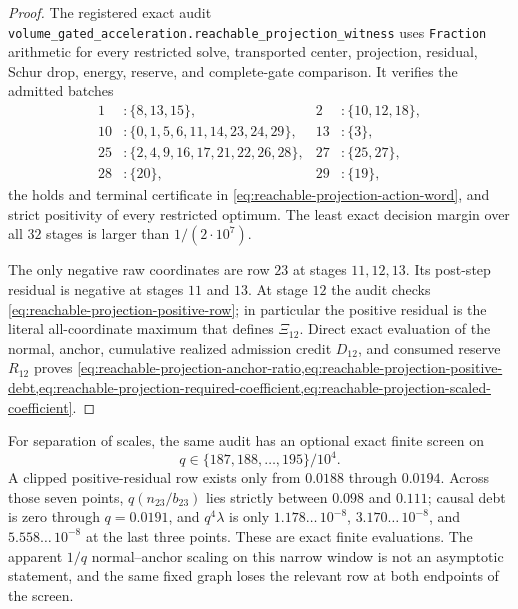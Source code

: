 \begin{proof}
The registered exact audit
\texttt{volume\_gated\_acceleration.reachable\_projection\_witness}
uses \texttt{Fraction} arithmetic for every restricted solve, transported
center, projection, residual, Schur drop, energy, reserve, and complete-gate
comparison.  It verifies the admitted batches
\begin{align*}
1&:\{8,13,15\},&2&:\{10,12,18\},\\
10&:\{0,1,5,6,11,14,23,24,29\},&13&:\{3\},\\
25&:\{2,4,9,16,17,21,22,26,28\},&27&:\{25,27\},\\
28&:\{20\},&29&:\{19\},
\end{align*}
the holds and terminal certificate in
\cref{eq:reachable-projection-action-word}, and strict positivity of every
restricted optimum.  The least exact decision margin over all $32$ stages is
larger than $1/(2\cdot10^7)$.

The only negative raw coordinates are row $23$ at stages $11,12,13$.  Its
post-step residual is negative at stages $11$ and $13$.  At stage $12$ the
audit checks \cref{eq:reachable-projection-positive-row}; in particular the
positive residual is the literal all-coordinate maximum that defines
$\Xi_{12}$.  Direct exact evaluation of the normal, anchor, cumulative
realized admission credit $D_{12}$, and consumed reserve $R_{12}$ proves
\cref{eq:reachable-projection-anchor-ratio,eq:reachable-projection-positive-debt,eq:reachable-projection-required-coefficient,eq:reachable-projection-scaled-coefficient}.
\end{proof}

For separation of scales, the same audit has an optional exact finite screen
on
\begin{equation*}
 q\in\{187,188,\ldots,195\}/10^4.
\end{equation*}
A clipped positive-residual row exists only from $0.0188$ through $0.0194$.
Across those seven points, $q(n_{23}/b_{23})$ lies strictly between $0.098$
and $0.111$; causal debt is zero through $q=0.0191$, and $q^4\lambda$ is only
$1.178\ldots\,10^{-8}$, $3.170\ldots\,10^{-8}$, and
$5.558\ldots\,10^{-8}$ at the last three points.  These are exact finite
evaluations.  The apparent $1/q$ normal--anchor scaling on this narrow window
is not an asymptotic statement, and the same fixed graph loses the relevant
row at both endpoints of the screen.
